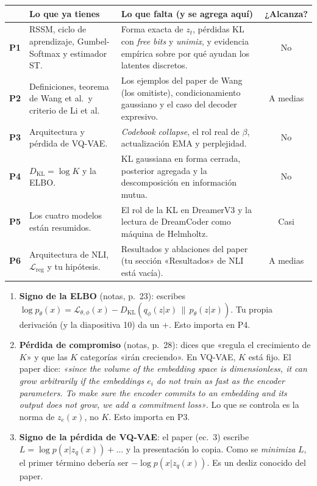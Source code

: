 \documentclass[11pt,a4paper]{article}
\newcommand{\KL}{D_{\mathrm{KL}}}
\begin{document}
\renewcommand{\arraystretch}{1.25}
\begin{center}
\small
\begin{tabularx}{\textwidth}{@{}>{\bfseries}l X X c@{}}
\toprule
 & Lo que ya tienes & Lo que falta (y se agrega aquí) & ¿Alcanza? \\
\midrule
P1 & RSSM, ciclo de aprendizaje, Gumbel-Softmax y estimador ST. & Forma exacta de $z_t$, pérdidas KL con \emph{free bits} y \emph{unimix}, y evidencia empírica sobre por qué ayudan los latentes discretos. & No \\
P2 & Definiciones, teorema de Wang et al.\ y criterio de Li et al. & Los ejemplos del paper de Wang (los omitiste), condicionamiento gaussiano y el caso del decoder expresivo. & A medias \\
P3 & Arquitectura y pérdida de VQ-VAE. & \emph{Codebook collapse}, el rol real de $\beta$, actualización EMA y perplejidad. & No \\
P4 & $\KL=\log K$ y la ELBO. & KL gaussiana en forma cerrada, posterior agregada y la descomposición en información mutua. & No \\
P5 & Los cuatro modelos están resumidos. & El rol de la KL en DreamerV3 y la lectura de DreamCoder como máquina de Helmholtz. & Casi \\
P6 & Arquitectura de NLI, $\mathcal{L}_{\mathrm{reg}}$ y tu hipótesis. & Resultados y ablaciones del paper (tu sección «Resultados» de NLI está vacía). & A medias \\
\bottomrule
\end{tabularx}
\end{center}

\begin{cuidado}
\begin{enumerate}[leftmargin=*]
  \item \textbf{Signo de la ELBO} (notas, p.~23): escribes $\log p_{\theta}(x)=\mathcal{L}_{\theta,\phi}(x)-\KL(q_{\phi}(z|x)\,\|\,p_{\theta}(z|x))$. Tu propia derivación (y la diapositiva 10) da un $+$. Esto importa en P4.
  \item \textbf{Pérdida de compromiso} (notas, p.~28): dices que «regula el crecimiento de $K$» y que las $K$ categorías «irán creciendo». En VQ-VAE, $K$ está fijo. El paper dice: \emph{«since the volume of the embedding space is dimensionless, it can grow arbitrarily if the embeddings $e_i$ do not train as fast as the encoder parameters. To make sure the encoder commits to an embedding and its output does not grow, we add a commitment loss»}. Lo que se controla es la norma de $z_e(x)$, no $K$. Esto importa en P3.
  \item \textbf{Signo de la pérdida de VQ-VAE}: el paper (ec.~3) escribe $L=\log p(x|z_q(x))+\dots$ y la presentación lo copia. Como se \emph{minimiza} $L$, el primer término debería ser $-\log p(x|z_q(x))$. Es un desliz conocido del paper.
\end{enumerate}
\end{cuidado}
\end{document}
